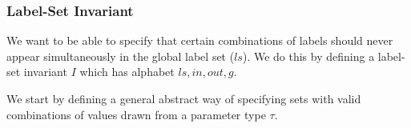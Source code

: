 \subsubsection{Label-Set Invariant}

We want to be able to specify that certain combinations
of labels should never appear simultaneously
in the global label set ($ls$).
We do this by defining a label-set invariant $I$
which has alphabet $ls,in,out,g$.

We start by defining a general abstract way of specifying
sets with valid combinations
of values drawn from a parameter type $\tau$.


